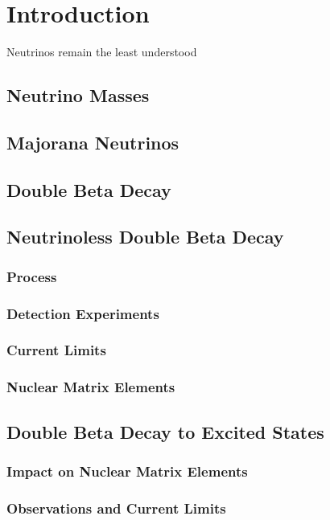 \chapter{Introduction}
\label{chapter:introduction}
\thispagestyle{myheadings}

\graphicspath{{1_Chapter_Intro/Figures/}}

Neutrinos remain the least understood 

\section{Neutrino Masses}
\section{Majorana Neutrinos}
\section{Double Beta Decay}
\section{Neutrinoless Double Beta Decay}
\subsection{Process}
\subsection{Detection Experiments}
\subsection{Current Limits}
\subsection{Nuclear Matrix Elements}
\section{Double Beta Decay to Excited States}
\subsection{Impact on Nuclear Matrix Elements}
\subsection{Observations and Current Limits}



